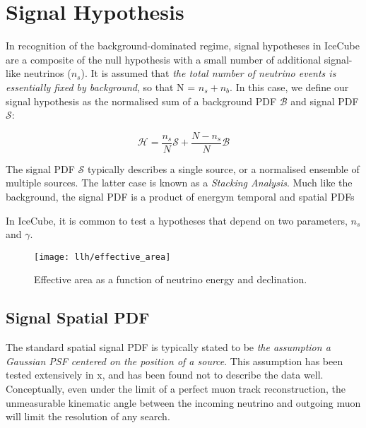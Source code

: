 \section{Signal Hypothesis}

In recognition of the background-dominated regime, signal hypotheses in IceCube are a composite of the null hypothesis with a small number of additional signal-like neutrinos ($n_{s}$). It is assumed that \emph{the total number of neutrino events is essentially fixed by background}, so that N = $n_{s} + n_{b}$. In this case, we define our signal hypothesis as the normalised sum of a background PDF $\mathcal{B}$ and signal PDF $\mathcal{S}$:

\begin{equation}
\mathcal{H}= \frac{n_{s}}{N} \mathcal{S} + \frac{N - n_{s}}{N} \mathcal{B} 
\end{equation}

The signal PDF $\mathcal{S}$ typically describes a single source, or a normalised ensemble of multiple sources. The latter case is known as a \emph{Stacking Analysis}. Much like the background, the signal PDF is a product of energym temporal and spatial PDFs

In IceCube, it is common to test a hypotheses that depend on two parameters, $n_{s}$ and $\gamma$. 

\begin{figure}[!ht]
	\centering \texttt{[image: llh/effective\_area]}
	\caption{Effective area as a function of neutrino energy and declination.}
	\label{fig:effective_area}
\end{figure}

\subsection{Signal Spatial PDF}

The standard spatial signal PDF is typically stated to be \emph{the assumption a Gaussian PSF centered on the position of a source}. This assumption has been tested extensively in x, and has been found not to describe the data well. Conceptually, even under the limit of a perfect muon track reconstruction, the unmeasurable kinematic angle between the incoming neutrino and outgoing muon will limit the resolution of any search.

